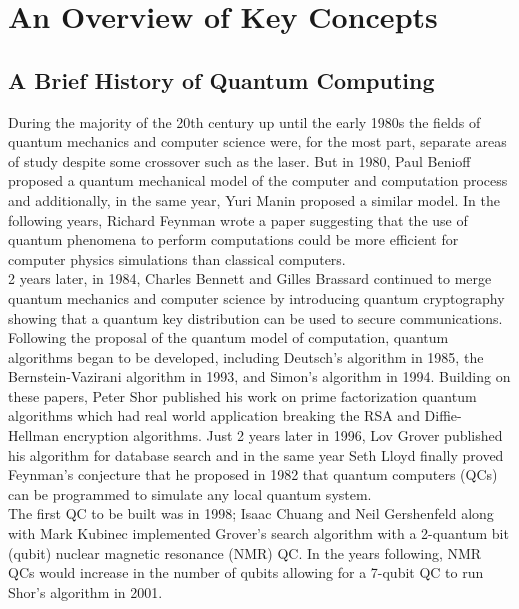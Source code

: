 \documentclass[reqno]{amsart}
\numberwithin{equation}{section}
\numberwithin{figure}{section}
\begin{document}
\section{An Overview of Key Concepts}
\subsection{A Brief History of Quantum Computing}
\begin{justify}
During the majority of the 20th century up until the early 1980s the fields of quantum mechanics and computer science were, for the most part, separate areas of study despite some crossover such as the laser. But in 1980, Paul Benioff proposed a quantum mechanical model of the computer and computation process \cite{Benioff1980} and additionally, in the same year, Yuri Manin proposed a similar model. \cite{Manin1980} In the following years, Richard Feynman wrote a paper suggesting that the use of quantum phenomena to perform computations could be more efficient for computer physics simulations than classical computers. \cite{Feynman1982} \\
2 years later, in 1984, Charles Bennett and Gilles Brassard continued to merge quantum mechanics and computer science by introducing quantum cryptography \cite{BennettBrassard1984} showing that a quantum key distribution can be used to secure communications. \\

Following the proposal of the quantum model of computation, quantum algorithms began to be developed, including Deutsch's algorithm in 1985, \cite{Deutsch1985} the Bernstein-Vazirani algorithm in 1993, \cite{BernsteinVazirani1993} and Simon's algorithm in 1994. \cite{Simon1994} Building on these papers, Peter Shor published his work on prime factorization quantum algorithms which had real world application breaking the RSA and Diffie-Hellman encryption algorithms. \cite{Shor1994} Just 2 years later in 1996, Lov Grover published his algorithm for database search \cite{Grover1996} and in the same year Seth Lloyd finally proved Feynman's conjecture that he proposed in 1982 that quantum computers (QCs) can be programmed to simulate any local quantum system. \cite{Lloyd1996} \\

The first QC to be built was in 1998; Isaac Chuang and Neil Gershenfeld along with Mark Kubinec implemented Grover's search algorithm with a 2-quantum bit (qubit) nuclear magnetic resonance (NMR) QC. \cite{ChuangGershefeldKubinec1998} In the years following, NMR QCs would increase in the number of qubits allowing for a 7-qubit QC to run Shor's algorithm in 2001. \cite{Vandersypen2001} \\


\end{justify}
\end{document}
